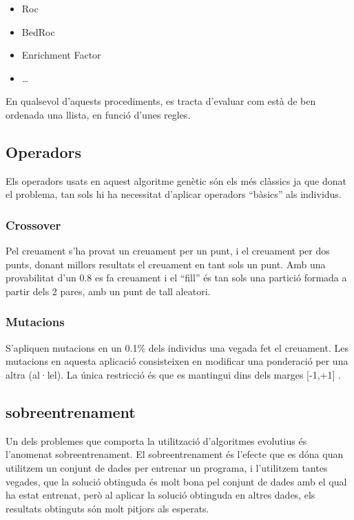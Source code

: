 \documentclass[titlepage,a4paper,12pt]{book}
\begin{document}
\begin{itemize}
	\item Roc
	\item BedRoc
	\item Enrichment Factor
	\item \dots
\end{itemize}


En qualsevol d'aquests procediments, es tracta d'evaluar com està de ben ordenada una llista, en
funció d'unes regles.

\subsection{Operadors} %
\label{sub:Operadors}

Els operadors usats en aquest algoritme genètic són els més clàssics ja que donat el problema, tan
sols hi ha necessitat d'aplicar operadors ``bàsics'' als individus.  

\subsubsection{Crossover} %
\label{ssub:Crossover}
Pel creuament s'ha provat un creuament per un punt, i el creuament per dos punts, donant millors
resultats el creuament en tant sols un punt.  Amb una provabilitat d'un 0.8 es fa creuament i el
``fill'' és tan sols una partició formada a partir dels 2 pares, amb un punt de tall aleatori.

\subsubsection{Mutacions} %
\label{ssub:Mutacions}

S'apliquen mutacions en un 0.1\% dels individus una vegada fet el creuament.  Les mutacions en
aquesta aplicació consisteixen en modificar una ponderació per una altra (al·lel).  La única
restricció és que es mantingui dins dels marges [-1,+1] .

\subsection{sobreentrenament} %
\label{sub:sobreentrenament}

Un dels problemes que comporta la utilització d'algoritmes evolutius és
l'anomenat sobreentrenament.  El sobreentrenament és l'efecte que es dóna quan
utilitzem un conjunt de dades per entrenar un programa, i l'utilitzem tantes
vegades, que la solució obtinguda és molt bona pel conjunt de dades amb el qual
ha estat entrenat, però al aplicar la solució obtinguda en altres dades, els
resultats obtinguts són molt pitjors als esperats.
\end{document}
